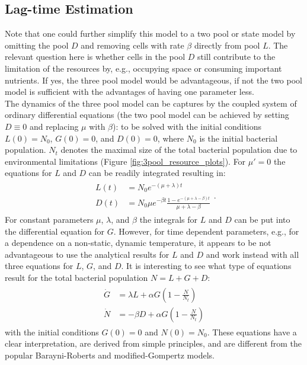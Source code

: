 \documentclass[10pt,A4paper]{article}
\numberwithin{equation}{section}
\begin{document}
\subsection{Lag-time Estimation}
Note that one could further simplify this model to a two pool or state model by omitting the pool $D$ and removing cells with rate $\beta$ directly from pool $L$.
The relevant question here is whether cells in the pool $D$ still contribute to the limitation of the resources by, e.g., occupying space or consuming important nutrients.
If yes, the three pool model would be advantageous, if not the two pool model is sufficient with the advantages of having one parameter less.\\
%
The dynamics of the three pool model can be captures by the coupled system of ordinary differential equations (the two pool model can be achieved by setting $D\equiv 0$ and replacing $\mu$ with $\beta$):
to be solved with the initial conditions $L(0)=N_0$, $G(0)=0$, and $D(0)=0$, where $N_0$ is the initial bacterial population.
$N_t$ denotes the maximal size of the total bacterial population due to environmental limitations (Figure \ref{fig:3pool_resource_plots}).
For $\mu'=0$ the equations for $L$ and $D$ can be readily integrated resulting in:
\begin{align}
    \begin{split}
        L(t) &= N_0 e^{-(\mu+\lambda)t}\\
        D(t) &= N_0 \mu e^{-\beta t}\frac{1-e^{-(\mu+\lambda-\beta)t}}{\mu+\lambda-\beta}
    \end{split}.
\end{align}
For constant parameters $\mu$, $\lambda$, and $\beta$ the integrals for $L$ and $D$ can be put into the differential equation for $G$.
However, for time dependent parameters, e.g., for a dependence on a non-static, dynamic temperature, it appears to be not advantageous to use the analytical results for $L$ and $D$ and work instead with all three equations for $L$, $G$, and $D$.
It is interesting to see what type of equations result for the total bacterial population $N=L+G+D$:
\begin{align}
    \begin{split}
        \dot{G} &= \lambda L + \alpha G\left(1-\frac{N}{N_t}\right)\\
        \dot{N} &= - \beta D + \alpha G\left(1-\frac{N}{N_t}\right)
    \end{split}
\end{align}
with the initial conditions $G(0)=0$ and $N(0)=N_0$. 
These equations have a clear interpretation, are derived from simple principles, and are different from the popular Barayni-Roberts and modified-Gompertz models.
\end{document}
